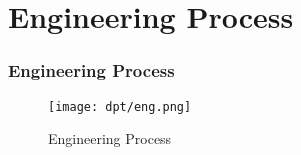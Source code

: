 \section{Engineering Process}

\begin{frame}
    \frametitle{Engineering Process}
    \begin{figure}
        \centering
        \texttt{[image: dpt/eng.png]} %
        \caption{Engineering Process}
    \end{figure}
\end{frame}



